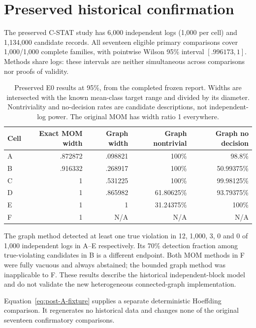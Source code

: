 \section{Preserved historical confirmation}
\label{app:post-historical}

The preserved C-STAT study has 6,000 independent logs (1,000 per cell) and
1,134,000 candidate records. All seventeen eligible primary comparisons cover
1,000/1,000 complete families, with pointwise Wilson 95\% interval
$[.996173,1]$. Methods share logs: these intervals are neither simultaneous
across comparisons nor proofs of validity.

\begin{table}[ht]
\centering
\caption{Preserved E0 results at 95\%, from the completed frozen report.
Widths are intersected with the known mean-class target range and divided by
its diameter. Nontriviality and no-decision rates are candidate descriptions,
not independent-log power. The original MOM has width ratio 1 everywhere.}
\label{tab:post-E0}
\small
\begin{tabular}{lrrrr}
\toprule
Cell & Exact MOM width & Graph width & Graph nontrivial & Graph no decision\\
\midrule
A & .872872 & .098821 & 100\% & 98.8\%\\
B & .916332 & .268917 & 100\% & 50.99375\%\\
C & 1 & .531225 & 100\% & 99.98125\%\\
D & 1 & .865982 & 61.80625\% & 93.79375\%\\
E & 1 & 1 & 31.24375\% & 100\%\\
F & 1 & N/A & N/A & N/A\\
\bottomrule
\end{tabular}
\end{table}

The graph method detected at least one true violation in 12, 1,000, 3, 0 and
0 of 1,000 independent logs in A--E respectively. Its 70\% detection fraction
among true-violating candidates in B is a different endpoint. Both MOM
methods in F were fully vacuous and always abstained; the bounded graph method
was inapplicable to F. These results describe the historical independent-block
model and do not validate the new heterogeneous connected-graph implementation.

Equation~\eqref{eq:post-A-fixture} supplies a separate deterministic Hoeffding
comparison. It regenerates no historical data and changes none of the original
seventeen confirmatory comparisons.
